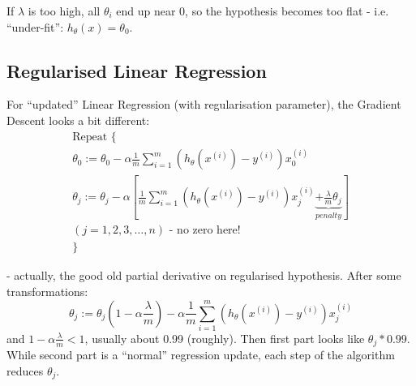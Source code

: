 \documentclass{scrartcl}
\begin{document}
If $\lambda$ is too high, all $\theta_i$ end up near 0, so the
hypothesis becomes too flat - i.e. ``under-fit'': $h_\theta(x) =
\theta_0$.

\subsection{Regularised Linear Regression}
\label{sec:7-3}
For ``updated'' Linear Regression (with regularisation parameter), the
Gradient Descent looks a bit different:
\[ \begin{array}{l}
  \textrm{Repeat }  \{ \\
  \theta_0 := \theta_0 - \alpha \frac {1}{m} \sum
  \limits_{i=1}^m(h_\theta(x^{(i)}) - y^{(i)}) x_0^{(i)} \\
  \theta_j := \theta_j - \alpha \left[ \frac {1}{m} \sum
    \limits_{i=1}^m(h_\theta(x^{(i)}) - y^{(i)}) x_j^{(i)}
    \underbrace{+
      \frac{\lambda}{m}\theta_j} _{penalty} \right] \\
  (j= 1, 2, 3, \dots , n) \textrm{ - no zero here!} \\
  \}
\end{array}
\]

- actually, the good old partial derivative on regularised hypothesis.
After some transformations: \[ \theta_j := \theta_j(1 -
\alpha\frac{\lambda}{m}) - \alpha \frac{1}{m} \sum
\limits_{i=1}^{m}(h_\theta(x^{(i)}) - y^{(i)})x_j^{(i)}
\]
and $1 - \alpha \frac{\lambda}{m} < 1$, usually about 0.99 (roughly).
Then first part looks like $\theta_j * 0.99$. While second part is a
``normal'' regression update, each step of the algorithm reduces
$\theta_j$.
\end{document}
